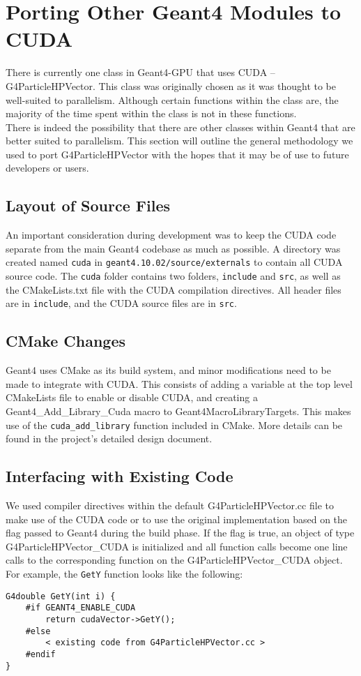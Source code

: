 \documentclass[12pt]{article}
\begin{document}
\section{Porting Other Geant4 Modules to CUDA} %
There is currently one class in Geant4-GPU that uses CUDA -- G4ParticleHPVector. This class was originally chosen as it was thought to be well-suited to parallelism. Although certain functions within the class are, the majority of the time spent within the class is not in these functions.\\

There is indeed the possibility that there are other classes within Geant4 that are better suited to parallelism. This section will outline the general methodology we used to port G4ParticleHPVector with the hopes that it may be of use to future developers or users.

\subsection{Layout of Source Files} %
An important consideration during development was to keep the CUDA code separate from the main Geant4 codebase as much as possible. A directory was created named \texttt{cuda} in \texttt{geant4.10.02/source/externals} to contain all CUDA source code. The \texttt{cuda} folder contains two folders, \texttt{include} and \texttt{src}, as well as the CMakeLists.txt file with the CUDA compilation directives. All header files are in \texttt{include}, and the CUDA source files are in \texttt{src}.

\subsection{CMake Changes} %
Geant4 uses CMake as its build system, and minor modifications need to be made to integrate with CUDA. This consists of adding a variable at the top level CMakeLists file to enable or disable CUDA, and creating a {Geant4\_Add\_Library\_Cuda} macro to Geant4MacroLibraryTargets. This makes use of the \texttt{cuda\_add\_library} function included in CMake. More details can be found in the project's detailed design document.

\subsection{Interfacing with Existing Code} %
We used compiler directives within the default G4ParticleHPVector.cc file to make use of the CUDA code or to use the original implementation based on the flag passed to Geant4 during the build phase. If the flag is true, an object of type \\G4ParticleHPVector\_CUDA is initialized and all function calls become one line calls to the corresponding function on the G4ParticleHPVector\_CUDA object. For example, the \texttt{GetY} function looks like the following:
\begin{lstlisting}
G4double GetY(int i) {
	#if GEANT4_ENABLE_CUDA
		return cudaVector->GetY();
	#else
		< existing code from G4ParticleHPVector.cc >
	#endif
}
\end{lstlisting}
\end{document}
